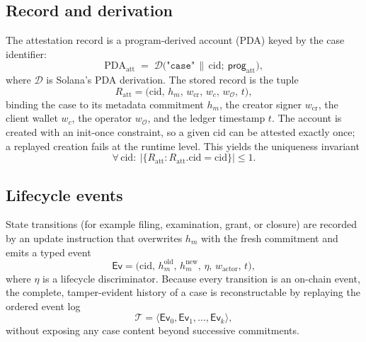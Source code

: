 \documentclass[conference]{IEEEtran}
\begin{document}
\subsection{Record and derivation}

The attestation record is a program-derived account (PDA) keyed by the case
identifier:
\begin{equation}
\mathrm{PDA}_{\mathrm{att}} \;=\; \mathcal{D}\big(\texttt{"case"} \,\|\,
\mathrm{cid};\ \mathsf{prog}_{\mathrm{att}}\big),
\end{equation}
where $\mathcal{D}$ is Solana's PDA derivation. The stored record is the tuple
\begin{equation}
R_{\mathrm{att}} = \big(\mathrm{cid},\, h_m,\, w_{\mathrm{cr}},\, w_c,\,
w_{\mathcal{O}},\, t\big),
\end{equation}
binding the case to its metadata commitment $h_m$, the creator signer
$w_{\mathrm{cr}}$, the client wallet $w_c$, the operator $w_{\mathcal{O}}$, and
the ledger timestamp $t$. The account is created with an init-once constraint,
so a given $\mathrm{cid}$ can be attested exactly once; a replayed creation
fails at the runtime level. This yields the uniqueness invariant
\begin{equation}
\forall\, \mathrm{cid}:\ \big|\{R_{\mathrm{att}} : R_{\mathrm{att}}.\mathrm{cid}
= \mathrm{cid}\}\big| \le 1.
\end{equation}

\subsection{Lifecycle events}

State transitions (for example filing, examination, grant, or closure) are
recorded by an update instruction that overwrites $h_m$ with the fresh
commitment and emits a typed event
\begin{equation}
\mathsf{Ev} = \big(\mathrm{cid},\, h_m^{\mathrm{old}},\, h_m^{\mathrm{new}},\,
\eta,\, w_{\mathrm{actor}},\, t\big),
\end{equation}
where $\eta$ is a lifecycle discriminator. Because every transition is an
on-chain event, the complete, tamper-evident history of a case is
reconstructable by replaying the ordered event log
\begin{equation}
\mathcal{T} = \big\langle \mathsf{Ev}_0, \mathsf{Ev}_1, \ldots,
\mathsf{Ev}_k \big\rangle,
\end{equation}
without exposing any case content beyond successive commitments.
\end{document}
